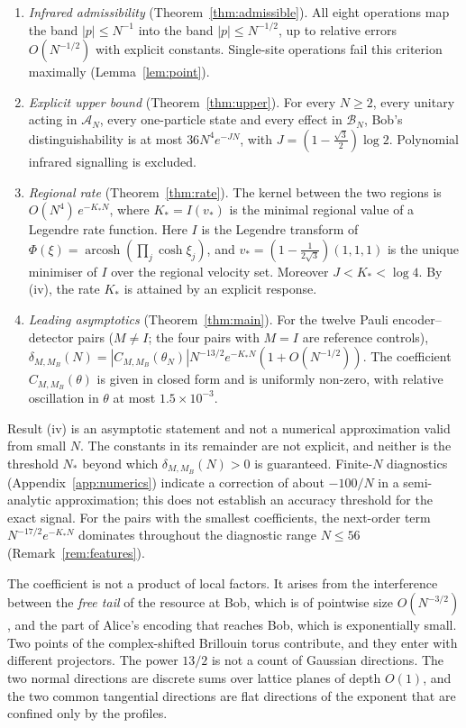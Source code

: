 \documentclass[11pt]{amsart}
\theoremstyle{definition}
\theoremstyle{remark}
\newcommand{\cA}{\mathcal{A}}
\newcommand{\cB}{\mathcal{B}}
\newcommand{\arcosh}{\operatorname{arcosh}}
\begin{document}
\begin{enumerate}[label=(\roman*)]
\item \emph{Infrared admissibility} (Theorem~\ref{thm:admissible}).  All
  eight operations map the band $|p|\le N^{-1}$ into the band
  $|p|\le N^{-1/2}$, up to relative errors $O(N^{-1/2})$ with explicit
  constants.  Single-site operations fail this criterion maximally
  (Lemma~\ref{lem:point}).
\item \emph{Explicit upper bound} (Theorem~\ref{thm:upper}).  For every
  $N\ge2$, every unitary acting in $\cA_N$, every one-particle state and
  every effect in $\cB_N$, Bob's distinguishability is at most
  $36N^4e^{-JN}$, with $J=(1-\tfrac{\sqrt3}{2})\log2$.  Polynomial infrared
  signalling is excluded.
\item \emph{Regional rate} (Theorem~\ref{thm:rate}).  The kernel between
  the two regions is $O(N^4)\,e^{-K_*N}$, where $K_*=I(v_*)$ is the minimal
  regional value of a Legendre rate function.  Here $I$ is the Legendre
  transform of $\Phi(\xi)=\arcosh(\prod_j\cosh\xi_j)$, and
  $v_*=(1-\frac1{2\sqrt3})(1,1,1)$ is the unique minimiser of $I$ over the
  regional velocity set.  Moreover $J<K_*<\log4$.  By (iv), the rate $K_*$
  is attained by an explicit response.
\item \emph{Leading asymptotics} (Theorem~\ref{thm:main}).  For the twelve
  Pauli encoder--detector pairs ($M\ne I$; the four pairs with $M=I$ are
  reference controls),
  $\delta_{M,M_B}(N)=|C_{M,M_B}(\theta_N)|N^{-13/2}e^{-K_*N}(1+O(N^{-1/2}))$.
  The coefficient $C_{M,M_B}(\theta)$ is given in closed form and is
  uniformly non-zero, with relative oscillation in $\theta$ at most
  $1.5\times10^{-3}$.
\end{enumerate}

Result (iv) is an asymptotic statement and not a numerical approximation
valid from small $N$.  The constants in its remainder are not explicit, and
neither is the threshold $N_*$ beyond which $\delta_{M,M_B}(N)>0$ is
guaranteed.  Finite-$N$ diagnostics (Appendix~\ref{app:numerics}) indicate
a correction of about $-100/N$ in a semi-analytic approximation; this does
not establish an accuracy threshold for the exact signal.  For the pairs with the
smallest coefficients, the next-order term $N^{-17/2}e^{-K_*N}$ dominates
throughout the diagnostic range $N\le56$ (Remark~\ref{rem:features}).

The coefficient is not a product of local factors.  It arises from the
interference between the \emph{free tail} of the resource at Bob, which is
of pointwise size $O(N^{-3/2})$, and the part of Alice's encoding that reaches Bob,
which is exponentially small.  Two points of the complex-shifted Brillouin
torus contribute, and they enter with different projectors.  The power
$13/2$ is not a count of Gaussian directions.  The two normal directions are
discrete sums over lattice planes of depth $O(1)$, and the two common
tangential directions are flat directions of the exponent that are confined
only by the profiles.
\end{document}

